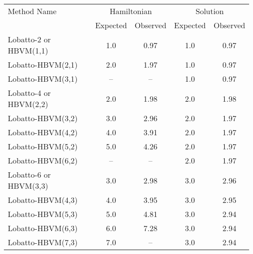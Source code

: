 \begin{tabular}{l|cccc}
\toprule
           Method Name & \multicolumn{2}{c}{Hamiltonian} & \multicolumn{2}{c}{Solution} \\
                       &    Expected & Observed & Expected & Observed \\
\midrule
Lobatto-2 or HBVM(1,1) &         1.0 &     0.97 &      1.0 &     0.97 \\
     Lobatto-HBVM(2,1) &         2.0 &     1.97 &      1.0 &     0.97 \\
     Lobatto-HBVM(3,1) &          -- &       -- &      1.0 &     0.97 \\
Lobatto-4 or HBVM(2,2) &         2.0 &     1.98 &      2.0 &     1.98 \\
     Lobatto-HBVM(3,2) &         3.0 &     2.96 &      2.0 &     1.97 \\
     Lobatto-HBVM(4,2) &         4.0 &     3.91 &      2.0 &     1.97 \\
     Lobatto-HBVM(5,2) &         5.0 &     4.26 &      2.0 &     1.97 \\
     Lobatto-HBVM(6,2) &          -- &       -- &      2.0 &     1.97 \\
Lobatto-6 or HBVM(3,3) &         3.0 &     2.98 &      3.0 &     2.96 \\
     Lobatto-HBVM(4,3) &         4.0 &     3.95 &      3.0 &     2.95 \\
     Lobatto-HBVM(5,3) &         5.0 &     4.81 &      3.0 &     2.94 \\
     Lobatto-HBVM(6,3) &         6.0 &     7.28 &      3.0 &     2.94 \\
     Lobatto-HBVM(7,3) &         7.0 &       -- &      3.0 &     2.94 \\
\bottomrule
\end{tabular}
